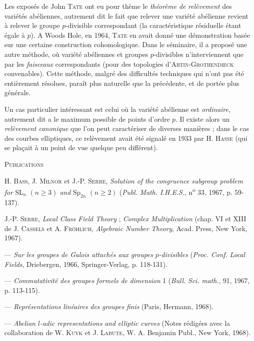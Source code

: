Les exposés de John \textsc{Tate} ont eu pour thème le \textit{théorème de relèvement} des variétés abéliennes, autrement dit le fait que relever une variété abélienne revient à relever le groupe $p$-divisible correspondant (la caractéristique résiduelle étant égale à $p$). A Woods Hole, en 1964, \textsc{Tate} en avait donné une démonstration basée sur une certaine construction cohomologique. Dans le séminaire, il a proposé une autre méthode, où variété abéliennes et groupes $p$-divisibles n’interviennent que par les \textit{faisceaux} correspondants (pour des topologies d’\textsc{Artin-Grothendieck} convenables). Cette méthode, malgré des difficultés techniques qui n’ont pas été entièrement résolues, paraît plus naturelle que la précédente, et de portée plus générale.

Un cas particulier intéressant est celui où la variété abélienne est \textit{ordinaire}, autrement dit a le maximum possible de points d’ordre $p$. Il existe alors un \textit{relèvement canonique} que l’on peut caractériser de diverses manières ; dans le cas des courbes elliptiques, ce relèvement avait été signalé en 1933 par H. \textsc{Hasse} (qui se plaçait à un point de vue quelque peu différent).

\begin{center}\textsc{Publications}\end{center}

H. \textsc{Bass}, J. \textsc{Milnor} et J.-P. \textsc{Serre}, \textit{Solution of the congruence subgroup problem for} $\mathrm{SL}_n$ $(n\geqslant 3)$ \textit{and} $\mathrm{Sp}_{2n}$ $(n\geqslant 2)$ (\textit{Publ. Math. I.H.E.S.}, n\textsuperscript{o} 33, 1967, p. 59-137).

J.-P. \textsc{Serre}, \textit{Local Class Field Theory} ; \textit{Complex Multiplication} (chap. VI et XIII de J. \textsc{Cassels} et A. \textsc{Fröhlich}, \textit{Algebraic Number Theory}, Acad. Press, New York, 1967).

--- \textit{Sur les groupes de Galois attachés aux groupes $p$-divisibles} (\textit{Proc. Conf. Local Fields}, Driebergen, 1966, Springer-Verlag, p. 118-131).

--- \textit{Commutativité des groupes formels de dimension} 1 (\textit{Bull. Sci. math.}, 91, 1967, p. 113-115).

--- \textit{Représentations linéaires des groupes finis} (Paris, Hermann, 1968).

--- \textit{Abelian $l$-adic representations and elliptic curves} (Notes rédigées avec la collaboration de W. \textsc{Kuyk} et J. \textsc{Labute}, W. A. Benjamin Publ., New York, 1968).

